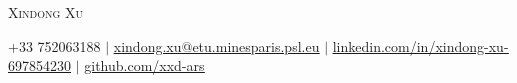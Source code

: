 \documentclass[letterpaper,11pt]{article}
\begin{document}

\begin{center}
    {\Huge \scshape Xindong Xu} \\ \vspace{1pt}

    
    \small +33 752063188 $|$ 
    \href{mailto:x@x.com}{\underline{xindong.xu@etu.minesparis.psl.eu}} $|$ 
    \href{https://linkedin.com/in/...}{\underline{linkedin.com/in/xindong-xu-697854230}} $|$
    \href{https://github.com/...}{\underline{github.com/xxd-ars}}
\end{center}


\end{document}
